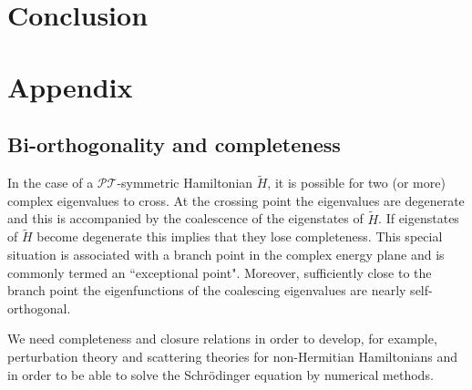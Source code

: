 \documentclass[12pt, a4paper]{report}
\newenvironment{Figure}
    {\par\medskip\noindent\minipage{\linewidth}}
    {\endminipage\par\medskip}
\newcommand\PT{\(\mathcal{PT}\)}
\begin{document}




\chapter{Conclusion}\label{Conclusion}





%


\chapter{Appendix}\label{appendix}

\section*{Bi-orthogonality and completeness}\label{}
In the case of a \PT-symmetric Hamiltonian $\tilde{H}$, it is possible for two (or more) complex eigenvalues to cross. At the crossing point the eigenvalues are degenerate and this is accompanied by the coalescence of the eigenstates of $\tilde{H}$. If eigenstates of $\tilde{H}$ become degenerate this implies that they lose completeness\cite{Brody_2013}. This special situation is associated with a branch point in the complex energy plane and is commonly termed an ``exceptional point"\cite{Moiseyev}. Moreover, sufficiently close to the branch point the eigenfunctions of the coalescing eigenvalues are nearly self-orthogonal.

We need completeness and closure relations in order to develop, for example, perturbation theory and scattering theories for non-Hermitian Hamiltonians and in order to be able to solve the Schrödinger equation by numerical methods\cite{Moiseyev}.
\end{document}
